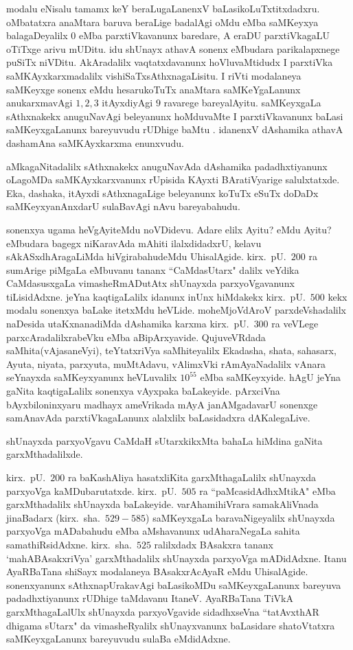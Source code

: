 modalu eNisalu tamamx keY beraLugaLanenxV baLasikoLuTxtitxdadxru. oMbatatxra anaMtara baruva beraLige badalAgi oMdu eMba saMKeyxya balagaDeyalilx $0$ eMba parxtiVkavanunx baredare, A eraDU parxtiVkagaLU oTiTxge arivu mUDitu. idu shUnayx athavA sonenx eMbudara parikalapxnege puSiTx niVDitu. AkAradalilx vaqtatxdavanunx hoVluvaMtidudx I parxtiVka saMKAyxkarxmadalilx vishiSaTxsAthxnagaLisitu. I riVti modalaneya saMKeyxge sonenx eMdu hesarukoTuTx anaMtara saMKeYgaLanunx anukarxmavAgi $1,2,3$ itAyxdi\-yAgi $9$ ravarege bareyalAyitu. saMKeyxgaLa sAthxnakekx anuguNavAgi beleyanunx hoMdu\-vaMte I parxtiVkavanunx baLasi saMKeyxgaLanunx bareyuvudu rUDhige baMtu . idanenxV dAshamika athavA dashamAna saMKAyxkarxma enunxvudu.

aMkagaNitadalilx sAthxnakekx anuguNavAda dAshamika padadhxtiyanunx oLagoMDa saMKAyx\-karxvanunx rUpisida KAyxti BAratiVyarige salulxtatxde. Eka, dashaka, itAyxdi sAthxnagaLige bele\-yanunx koTuTx eSuTx doDaDx saMKeyxyanAnxdarU sulaBavAgi nAvu bareyabahudu.

sonenxya ugama heVgAyiteMdu noVDidevu. Adare elilx Ayitu? eMdu Ayitu? eMbudara bagegx niKaravAda mAhiti ilalxdidadxrU, kelavu sAkASxdhAragaLiMda hiVgirabahudeMdu UhisalAgide. kirx.~pU.\ $200$ ra sumArige piMgaLa eMbuvanu tananx ``CaMdasUtarx" dalilx veYdika CaMdasusxgaLa vimasheRmADutAtx shUnayxda parxyoVgavanunx tiLisidAdxne. jeYna kaqtigaLalilx idanunx inUnx hiMdakekx kirx.~pU.\ $500$ kekx modalu sonenxya baLake itetxMdu heVLide. moheMjoVdAroV parxdeVshadalilx naDesida utaKxnanadiMda dAshamika karxma kirx.~pU.\ $300$ ra veVLege parxcAradalilxrabeVku eMba aBipArxyavide. QujuveVRdada saMhita(vAjasaneVyi), teYtatxriVya saMhiteyalilx Ekadasha, shata, sahasarx, Ayuta, niyata, parxyuta, muMtAdavu, vAlimxVki rAmAyaNadalilx vAnara seYnayxda saMKeyxyanunx heVLuvalilx $10^{55}$ eMba saMKeyxyide. hAgU jeYna gaNita kaqtigaLalilx sonenxya vAyxpaka baLakeyide. pArxciVna bAyxbiloninxyaru madhayx ameVrikada mAyA janAMgadavarU sonenxge samAnavAda parxtiVkagaLanunx alalxlilx baLasidadxra dAKalegaLive. 

shUnayxda parxyoVgavu CaMdaH sUtarxkikxMta bahaLa hiMdina gaNita garxMthadalilxde.

kirx.~pU.\ $200$ ra baKashAliya hasatxliKita garxMthagaLalilx shUnayxda parxyoVga kaMDu\-barutatxde. kirx.~pU.\ $505$ ra ``paMcasidAdhxMtikA" eMba garxMthadalilx shUnayxda baLakeyide. varAha\-mihiVrara samakAliVnada jinaBadarx (kirx.~sha.\ $529-585$) saMKeyxgaLa baravaNige\-yalilx shUnayxda parxyoVga mADabahudu eMba aMshavanunx udAharaNegaLa sahita samathiRsidAdxne. kirx.~sha.\ $525$ ralilxdadx BAsakxra tananx `mahABAsakxriVya' garxMthadalilx shUnayxda parxyoVga mADidAdxne. Itanu AyaRBaTana shiSayx modalaneya BAsakxrAcAyaR eMdu UhisalAgide. sonenxyanunx sAthxnapUrakavAgi baLasikoMDu saMKeyxgaLanunx bareyuva padadhxtiyanunx rUDhige taMdavanu ItaneV. AyaRBaTana TiVkA garxMthagaLalUlx shUnayxda parxyoVgavide sidadhxseVna ``tatAvxthAR dhigama sUtarx" da vimasheRyalilx shUnayx\-vanunx baLasidare shatoVtatxra saMKeyxgaLanunx bareyuvudu sulaBa eMdidAdxne.

